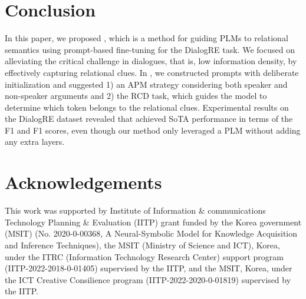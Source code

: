 \documentclass[11pt]{article}
\begin{document}
\section{Conclusion\label{conclusion}}

In this paper, we proposed , which is a method for guiding PLMs to relational semantics using prompt-based fine-tuning for the DialogRE task. We focused on alleviating the critical challenge in dialogues, that is, low information density, by effectively capturing relational clues. In , we constructed prompts with deliberate initialization and suggested 1) an APM strategy considering both speaker and non-speaker arguments and 2) the RCD task, which guides the model to determine which token belongs to the relational clues. Experimental results on the DialogRE dataset revealed that  achieved SoTA performance in terms of the F1 and F1 scores, even though our method only leveraged a PLM without adding any extra layers. 


\section*{Acknowledgements}
This work was supported by Institute of Information \& communications Technology Planning \& Evaluation (IITP) grant funded by the Korea government (MSIT) (No. 2020-0-00368, A Neural-Symbolic Model for Knowledge Acquisition and Inference Techniques), the MSIT (Ministry of Science and ICT), Korea, under the ITRC (Information Technology Research Center) support program (IITP-2022-2018-0-01405) supervised by the IITP, and the MSIT, Korea, under the ICT Creative Consilience program (IITP-2022-2020-0-01819) supervised by the IITP.



\appendix\label{appendix}
\clearpage
\end{document}
